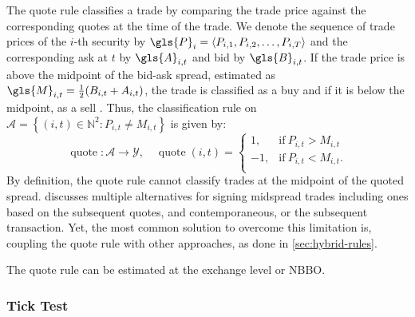 The quote rule classifies a trade by comparing the trade price against the corresponding quotes at the time of the trade. We denote the sequence of trade prices of the $i$-th security by $\gls{P}_i = \langle P_{i,1},P_{i,2},\dots,P_{i,T}\rangle$ and the corresponding ask at $t$ by $\gls{A}_{i,t}$ and bid by $\gls{B}_{i,t}$. If the trade price is above the midpoint of the bid-ask spread, estimated as $\gls{M}_{i,t} = \tfrac{1}{2}(B_{i,t} + A_{i,t})$, the trade is classified as a buy and if it is below the midpoint, as a sell \autocite[][41]{harrisDayEndTransactionPrice1989}. Thus, the classification rule on $\mathcal{A} = \left\{(i, t) \in \mathbb{N}^2: P_{i,t} \neq M_{i,t}\right\}$ is given by:
\begin{equation}
    \operatorname{quote}\colon \mathcal{A} \to \mathcal{Y},\quad
    \operatorname{quote}(i, t)=
    \begin{cases}
        1,  & \mathrm{if}\ P_{i, t}>M_{i, t}  \\
        -1, & \mathrm{if}\ P_{i, t}<M_{i, t}. \\
    \end{cases}
\end{equation}
By definition, the quote rule cannot classify trades at the midpoint of the quoted spread. \textcite[][241]{hasbrouckTradesQuotesInventories1988} discusses multiple alternatives for signing midspread trades including ones based on the subsequent quotes, and contemporaneous, or the subsequent transaction. Yet, the most common solution to overcome this limitation is, coupling the quote rule with other approaches, as done in \cref{sec:hybrid-rules}.


The quote rule can be estimated at the exchange level or \gls{NBBO}.

\subsubsection{Tick Test}\label{sec:tick-test}


